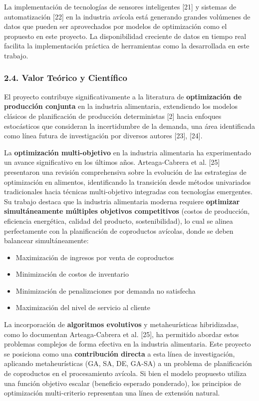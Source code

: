 \documentclass[
  spanish,
  12pt,
]{article}
\providecommand{\tightlist}{%
  \setlength{\itemsep}{0pt}\setlength{\parskip}{0pt}}
\begin{document}
La implementación de tecnologías de sensores inteligentes {[}21{]} y
sistemas de automatización {[}22{]} en la industria avícola está
generando grandes volúmenes de datos que pueden ser aprovechados por
modelos de optimización como el propuesto en este proyecto. La
disponibilidad creciente de datos en tiempo real facilita la
implementación práctica de herramientas como la desarrollada en este
trabajo.

\subsubsection{2.4. Valor Teórico y
Científico}\label{valor-teuxf3rico-y-cientuxedfico}

El proyecto contribuye significativamente a la literatura de
\textbf{optimización de producción conjunta} en la industria
alimentaria, extendiendo los modelos clásicos de planificación de
producción deterministas {[}2{]} hacia enfoques estocásticos que
consideran la incertidumbre de la demanda, una área identificada como
línea futura de investigación por diversos autores {[}23{]}, {[}24{]}.

La \textbf{optimización multi-objetivo} en la industria alimentaria ha
experimentado un avance significativo en los últimos años.
Arteaga-Cabrera et al. {[}25{]} presentaron una revisión comprehensiva
sobre la evolución de las estrategias de optimización en alimentos,
identificando la transición desde métodos univariados tradicionales
hacia técnicas multi-objetivo integradas con tecnologías emergentes. Su
trabajo destaca que la industria alimentaria moderna requiere
\textbf{optimizar simultáneamente múltiples objetivos competitivos}
(costos de producción, eficiencia energética, calidad del producto,
sostenibilidad), lo cual se alinea perfectamente con la planificación de
coproductos avícolas, donde se deben balancear simultáneamente:

\begin{itemize}
\tightlist
\item
  Maximización de ingresos por venta de coproductos
\item
  Minimización de costos de inventario
\item
  Minimización de penalizaciones por demanda no satisfecha
\item
  Maximización del nivel de servicio al cliente
\end{itemize}

La incorporación de \textbf{algoritmos evolutivos} y metaheurísticas
hibridizadas, como lo documentan Arteaga-Cabrera et al. {[}25{]}, ha
permitido abordar estos problemas complejos de forma efectiva en la
industria alimentaria. Este proyecto se posiciona como una
\textbf{contribución directa} a esta línea de investigación, aplicando
metaheurísticas (GA, SA, DE, GA-SA) a un problema de planificación de
coproductos en el procesamiento avícola. Si bien el modelo propuesto
utiliza una función objetivo escalar (beneficio esperado ponderado), los
principios de optimización multi-criterio representan una línea de
extensión natural.
\end{document}
